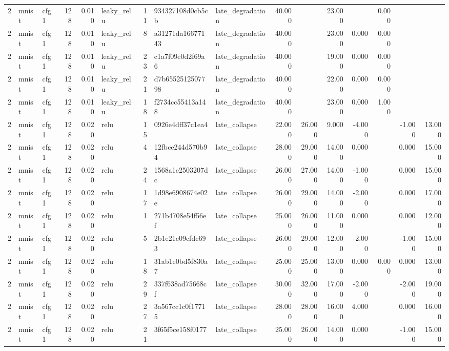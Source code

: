 \begin{table}[htbp]
{\begin{tabular}{@{}rllrrlrllrrrrrrr@{}}
2 & mnist & cfg1 & 128 & 0.010 & leaky\_relu & 11 & 934327108d0cb5cb & late\_degradation & 40.000 &  & 23.000 &  & 0.000 &  &  \\
2 & mnist & cfg1 & 128 & 0.010 & leaky\_relu & 8 & a31271da16677143 & late\_degradation & 40.000 &  & 23.000 & 0.000 & 0.000 &  &  \\
2 & mnist & cfg1 & 128 & 0.010 & leaky\_relu & 23 & c1a7f09e0d2f69a6 & late\_degradation & 40.000 &  & 19.000 & 0.000 & 0.000 &  &  \\
2 & mnist & cfg1 & 128 & 0.010 & leaky\_relu & 21 & d7b6552512507798 & late\_degradation & 40.000 &  & 22.000 & 0.000 & 0.000 &  &  \\
2 & mnist & cfg1 & 128 & 0.010 & leaky\_relu & 18 & f2734cc55413a148 & late\_degradation & 40.000 &  & 23.000 & 0.000 & 1.000 &  &  \\
2 & mnist & cfg1 & 128 & 0.020 & relu & 15 & 0926e4dff37c1ea4 & late\_collapse & 22.000 & 26.000 & 9.000 & -4.000 &  & -1.000 & 13.000 \\
2 & mnist & cfg1 & 128 & 0.020 & relu & 4 & 12fbce244d570b94 & late\_collapse & 28.000 & 29.000 & 14.000 & 0.000 &  & 0.000 & 15.000 \\
2 & mnist & cfg1 & 128 & 0.020 & relu & 24 & 1568a1e2503207dc & late\_collapse & 26.000 & 27.000 & 14.000 & -1.000 &  & 0.000 & 15.000 \\
2 & mnist & cfg1 & 128 & 0.020 & relu & 17 & 1d98e6908674e02e & late\_collapse & 26.000 & 29.000 & 14.000 & -2.000 &  & 0.000 & 17.000 \\
2 & mnist & cfg1 & 128 & 0.020 & relu & 1 & 271b4708e54f56ef & late\_collapse & 25.000 & 26.000 & 11.000 & 0.000 &  & 0.000 & 12.000 \\
2 & mnist & cfg1 & 128 & 0.020 & relu & 5 & 2b1e21c09cfdc693 & late\_collapse & 26.000 & 29.000 & 12.000 & -2.000 &  & -1.000 & 15.000 \\
2 & mnist & cfg1 & 128 & 0.020 & relu & 18 & 31ab1e0bd5f830a7 & late\_collapse & 25.000 & 25.000 & 13.000 & 0.000 & 0.000 & 0.000 & 13.000 \\
2 & mnist & cfg1 & 128 & 0.020 & relu & 29 & 337f638ad75668cf & late\_collapse & 30.000 & 32.000 & 17.000 & -2.000 &  & -2.000 & 19.000 \\
2 & mnist & cfg1 & 128 & 0.020 & relu & 27 & 3a567cc1c0f17715 & late\_collapse & 28.000 & 28.000 & 16.000 & 4.000 &  & 0.000 & 16.000 \\
2 & mnist & cfg1 & 128 & 0.020 & relu & 21 & 3f65f5ce158f0177 & late\_collapse & 25.000 & 26.000 & 14.000 & 0.000 &  & -1.000 & 15.000 \\

\end{tabular}}
\end{table}
